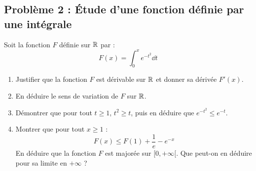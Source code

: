 \subsection*{Problème 2 : Étude d'une fonction définie par une intégrale}
Soit la fonction $F$ définie sur $\mathbb{R}$ par :
\[
F(x) = \int_0^x e^{-t^2} \dd t
\]
\begin{enumerate}
    \item Justifier que la fonction $F$ est dérivable sur $\mathbb{R}$ et donner sa dérivée $F'(x)$.
    \item En déduire le sens de variation de $F$ sur $\mathbb{R}$.
    \item Démontrer que pour tout $t \ge 1$, $t^2 \ge t$, puis en déduire que $e^{-t^2} \le e^{-t}$.
    \item Montrer que pour tout $x \ge 1$ :
    \[
    F(x) \le F(1) + \frac{1}{e} - e^{-x}
    \]
    En déduire que la fonction $F$ est majorée sur $[0, +\infty[$. Que peut-on en déduire pour sa limite en $+\infty$ ?
\end{enumerate}

